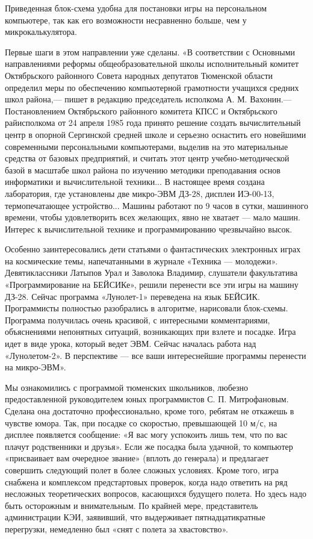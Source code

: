 \documentclass[11pt,a4paper,oneside]{article}
\begin{document}
Приведенная блок-схема удобна для постановки игры на персональном компьютере, так как его возможности несравненно больше, чем у микрокалькулятора.

Первые шаги в этом направлении уже сделаны. «В соответствии с Основными направлениями реформы общеобразовательной школы исполнительный комитет Октябрьского районного Совета народных депутатов Тюменской области определил меры по обеспечению компьютерной грамотности учащихся средних школ района,— пишет в редакцию председатель исполкома А. М. Вахонин.— Постановлением Октябрьского районного комитета КПСС и Октябрьского райисполкома от 24 апреля 1985 года принято решение создать вычислительный центр в опорной Сергинской средней школе и серьезно оснастить его новейшими современными персональными компьютерами, выделив на это материальные средства от базовых предприятий, и считать этот центр учебно-методической базой в масштабе школ района по изучению методики преподавания основ информатики и вычислительной техники... В настоящее время создана лаборатория, где установлены две микро-ЭВМ ДЗ-28, дисплеи ИЭ-00-13, термопечатающее устройство... Машины работают по 9 часов в сутки, машинного времени, чтобы удовлетворить всех желающих, явно не хватает — мало машин. Интерес к вычислительной технике и программированию чрезвычайно высок.

Особенно заинтересовались дети статьями о фантастических электронных играх на космические темы, напечатанными в журнале «Техника — молодежи». Девятиклассники Латыпов Урал и Заволока Владимир, слушатели факультатива «Программирование на БЕЙСИКе», решили перенести все эти игры на машину ДЗ-28. Сейчас программа «Лунолет-1» переведена на язык БЕЙСИК. Программисты полностью разобрались в алгоритме, нарисовали блок-схемы. Программа получилась очень красивой, с интересными комментариями, объяснениями непонятных ситуаций, возникающих при взлете и посадке. Игра идет в виде урока, который ведет ЭВМ. Сейчас началась работа над «Лунолетом-2». В перспективе — все ваши интереснейшие программы перенести на микро-ЭВМ».

Мы ознакомились с программой тюменских школьников, любезно предоставленной руководителем юных программистов С. П. Митрофановым. Сделана она достаточно профессионально, кроме того, ребятам не откажешь в чувстве юмора. Так, при посадке со скоростью, превышающей 10 м/с, на дисплее появляется сообщение: «Я вас могу успокоить лишь тем, что по вас плачут родственники и друзья». Если же посадка была удачной, то компьютер «присваивает вам очередное звание» (вплоть до генерала) и предлагает совершить следующий полет в более сложных условиях. Кроме того, игра снабжена и комплексом предстартовых проверок, когда надо ответить на ряд несложных теоретических вопросов, касающихся будущего полета. Но здесь надо быть осторожным и внимательным. По крайней мере, представитель администрации КЭИ, заявивший, что выдерживает пятнадцатикратные перегрузки, немедленно был «снят с полета за хвастовство».
\end{document}
